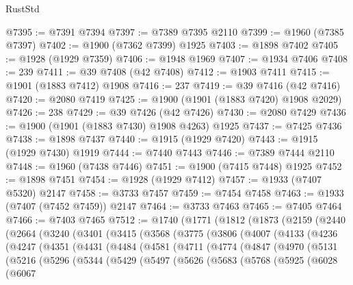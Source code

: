\begin{lexlean}{RustStd}
\begin{coremodule}
@7395 := @7391 @7394
@7397 := @7389 @7395 @2110
@7399 := @1960 (@7385 @7397)
@7402 := @1900 (@7362 @7399) @1925
@7403 := @1898 @7402
@7405 := @1928 (@1929 @7359)
@7406 := @1948 @1969
@7407 := @1934 @7406
@7408 := 239
@7411 := @39 @7408 (@42 @7408)
@7412 := @1903 @7411
@7415 := @1901 (@1883 @7412) @1908
@7416 := 237
@7419 := @39 @7416 (@42 @7416)
@7420 := @2080 @7419
@7425 := @1900 (@1901 (@1883 @7420) @1908 @2029)
@7426 := 238
@7429 := @39 @7426 (@42 @7426)
@7430 := @2080 @7429
@7436 := @1900 (@1901 (@1883 @7430) @1908 @4263) @1925
@7437 := @7425 @7436
@7438 := @1898 @7437
@7440 := @1915 (@1929 @7420)
@7443 := @1915 (@1929 @7430) @1919
@7444 := @7440 @7443
@7446 := @7389 @7444 @2110
@7448 := @1960 (@7438 @7446)
@7451 := @1900 (@7415 @7448) @1925
@7452 := @1898 @7451
@7454 := @1928 (@1929 @7412)
@7457 := @1933 (@7407 @5320) @2147
@7458 := @3733 @7457
@7459 := @7454 @7458
@7463 := @1933 (@7407 (@7452 @7459)) @2147
@7464 := @3733 @7463
@7465 := @7405 @7464
@7466 := @7403 @7465
@7512 := @1740
    (@1771
      (@1812
        (@1873
          (@2159
            (@2440
              (@2664
                (@3240
                  (@3401
                    (@3415
                      (@3568
                        (@3775
                          (@3806
                            (@4007
                              (@4133
                                (@4236
                                  (@4247
                                    (@4351
                                      (@4431
                                        (@4484
                                          (@4581
                                            (@4711
                                              (@4774
                                                (@4847
                                                  (@4970
                                                    (@5131
                                                      (@5216
                                                        (@5296
                                                          (@5344
                                                            (@5429
                                                              (@5497
                                                                (@5626
                                                                  (@5683
                                                                    (@5768
                                                                      (@5925
                                                                        (@6028
                                                                          (@6067

\end{coremodule}
\end{lexlean}
